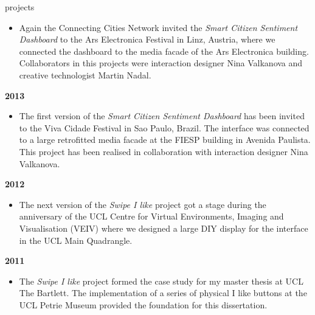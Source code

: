 \begin{acknowledgements}
\begin{singlespace}
{\begin{labeling}{projects}
\begin {itemize}
\item Again the Connecting Cities Network invited the \textit{Smart Citizen Sentiment Dashboard} to the Ars Electronica Festival in Linz, Austria, where we connected the dashboard to the media facade of the Ars Electronica building. Collaborators in this projects were interaction designer Nina Valkanova and creative technologist Martin Nadal.
\end{itemize}

\item [\textbf{2013}] 
\begin {itemize} 
\item The first version of the \textit{Smart Citizen Sentiment Dashboard} has been invited to the Viva Cidade Festival in Sao Paulo, Brazil. The interface was connected to a large retrofitted media facade at the FIESP building in Avenida Paulista. This project has been realised in collaboration with interaction designer Nina Valkanova. 
\end{itemize}

\item [\textbf{2012}] 
\begin {itemize} 
\item The next version of the \textit{Swipe I like} project got a stage during the anniversary of the UCL Centre for Virtual Environments, Imaging and Visualisation (VEIV) where we designed a large DIY display for the interface in the UCL Main Quadrangle.  
\end{itemize}

\item [\textbf{2011}] 
\begin {itemize} 
\item The \textit{Swipe I like} project formed the case study for my master thesis at UCL The Bartlett. The implementation of a series of physical I like buttons at the UCL Petrie Museum provided the foundation for this dissertation.   
\end{itemize}

\end{labeling}

}
\end{singlespace}




\end{acknowledgements}


\setcounter{tocdepth}{5} 

\tableofcontents
\listoffigures
\listoftables

